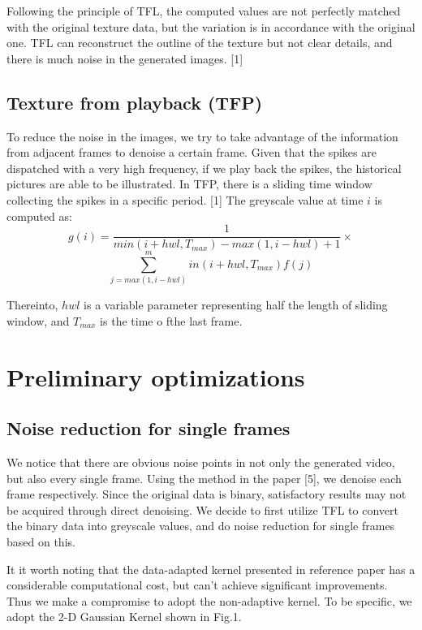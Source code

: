 \documentclass[10pt,twocolumn,letterpaper]{article}
\begin{document}
Following the principle of TFL, the computed values are not perfectly matched with the original texture data, but the variation is in accordance with the original one. TFL can reconstruct the outline of the texture but not clear details, and there is much noise in the generated images. [1]

\subsection{Texture from playback (TFP)}

To reduce the noise in the images, we try to take advantage of the information from adjacent frames to denoise a certain frame. Given that the spikes are dispatched with a very high frequency, if we play back the spikes, the historical pictures are able to be illustrated. In TFP, there is a sliding time window collecting the spikes in a specific period. [1] The greyscale value at time $i$ is computed as:
    $$g(i) = \frac{1}{min(i+hwl,T_{max})-max(1,i-hwl)+1}\times$$
    $$\sum_{j=max(1,i-hwl)}^min(i+hwl,T_{max}) f(j)$$

Thereinto, $hwl$ is a variable parameter representing half the length of sliding window, and $T_{max}$ is the time o fthe last frame.

\section{Preliminary optimizations}

\subsection{Noise reduction for single frames}

We notice that there are obvious noise points in not only the generated video, but also every single frame. Using the method in the paper [5], we denoise each frame respectively. Since the original data is binary, satisfactory results may not be acquired through direct denoising. We decide to first utilize TFL to convert the binary data into greyscale values, and do noise reduction for single frames based on this.

It it worth noting that the data-adapted kernel presented in reference paper has a considerable computational cost, but can't achieve significant improvements. Thus we make a compromise to adopt the non-adaptive kernel. To be specific, we adopt the 2-D Gaussian Kernel shown in Fig.1.
\end{document}
